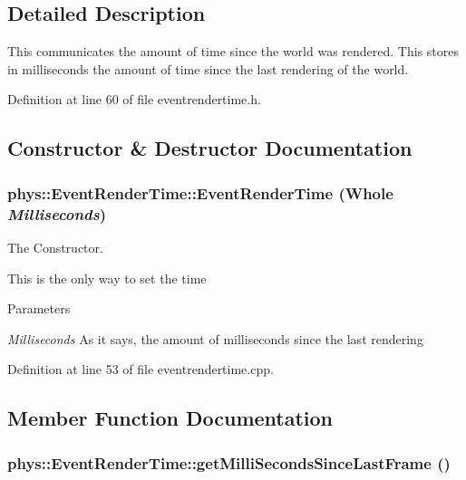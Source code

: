 \subsection{Detailed Description}
This communicates the amount of time since the world was rendered. This stores in milliseconds the amount of time since the last rendering of the world. 

Definition at line 60 of file eventrendertime.h.



\subsection{Constructor \& Destructor Documentation}
\hypertarget{classphys_1_1EventRenderTime_af2384f7b09bbea42dcd2539a9e1747fd}{
\subsubsection[{EventRenderTime}]{\setlength{\rightskip}{0pt plus 5cm}phys::EventRenderTime::EventRenderTime ({\bf Whole} {\em Milliseconds})}}
\label{d3/d8b/classphys_1_1EventRenderTime_af2384f7b09bbea42dcd2539a9e1747fd}


The Constructor. 

This is the only way to set the time 
\begin{DoxyParams}{Parameters}
\item[{\em Milliseconds}]As it says, the amount of milliseconds since the last rendering \end{DoxyParams}


Definition at line 53 of file eventrendertime.cpp.



\subsection{Member Function Documentation}
\hypertarget{classphys_1_1EventRenderTime_ac9f20f13bf1f6e542151be2ce8ea2fa4}{
\subsubsection[{getMilliSecondsSinceLastFrame}]{ phys::EventRenderTime::getMilliSecondsSinceLastFrame ()}}
\label{d3/d8b/classphys_1_1EventRenderTime_ac9f20f13bf1f6e542151be2ce8ea2fa4}


